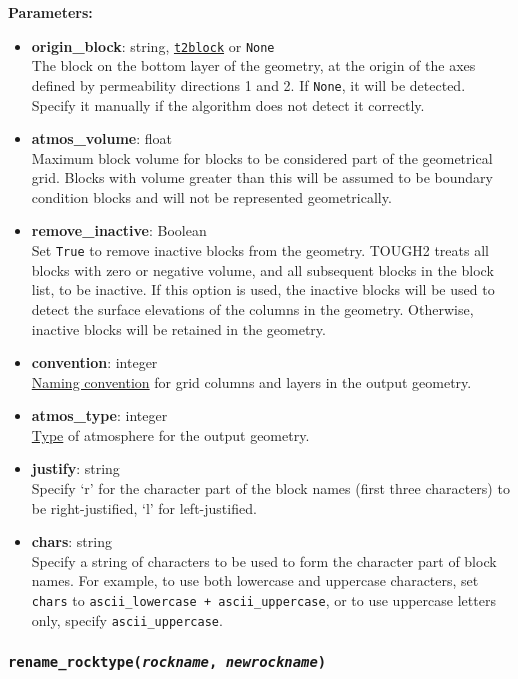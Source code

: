 \textbf{Parameters:}
\begin{itemize}
\item \textbf{origin\_block}: string, \hyperref[t2blockobjects]{\texttt{t2block}} or \texttt{None}\\
  The block on the bottom layer of the geometry, at the origin of the axes defined by permeability directions 1 and 2. If \texttt{None}, it will be detected. Specify it manually if the algorithm does not detect it correctly.
  \item \textbf{atmos\_volume}: float\\
    Maximum block volume for blocks to be considered part of the geometrical grid. Blocks with volume greater than this will be assumed to be boundary condition blocks and will not be represented geometrically.
  \item \textbf{remove\_inactive}: Boolean\\
    Set \texttt{True} to remove inactive blocks from the geometry. TOUGH2 treats all blocks with zero or negative volume, and all subsequent blocks in the block list, to be inactive. If this option is used, the inactive blocks will be used to detect the surface elevations of the columns in the geometry. Otherwise, inactive blocks will be retained in the geometry.
\item \textbf{convention}: integer\\
  \hyperref[geometry_format_conventions]{Naming convention} for grid columns and layers in the output geometry.
\item \textbf{atmos\_type}: integer\\
  \hyperref[geometry_format_conventions]{Type} of atmosphere for the output geometry.
\item \textbf{justify}: string\\
  Specify `r' for the character part of the block names (first three characters) to be right-justified, `l' for left-justified.
\item \textbf{chars}: string\\
  Specify a string of characters to be used to form the character part of block names.  For example, to use both lowercase and uppercase characters, set \texttt{chars} to \texttt{ascii\_lowercase + ascii\_uppercase}, or to use uppercase letters only, specify \texttt{ascii\_uppercase}.

\end{itemize}

\begin{snugshade}
\subsubsection{\texttt{rename\_rocktype(\emph{rockname}, \emph{newrockname})}}
\end{snugshade}
\label{sec:t2grid:rename_rocktype}

